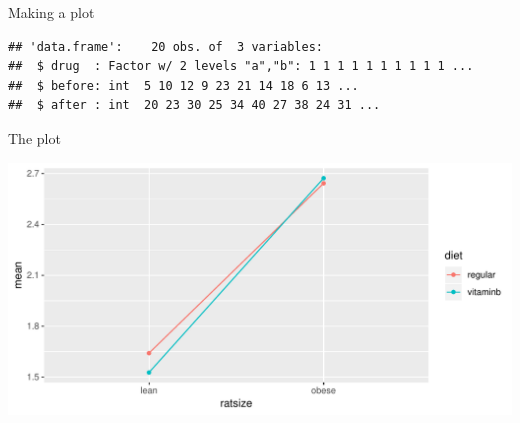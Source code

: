 \begin{frame}[fragile]{Making a plot}

  \begin{footnotesize}

    
  \end{footnotesize}
 
\begin{knitrout}
\color{fgcolor}\begin{kframe}
\begin{alltt}
\hlkwb{=}\hlstd{(}\hlstd{,}
\end{alltt}
\begin{verbatim}
## 'data.frame':	20 obs. of  3 variables:
##  $ drug  : Factor w/ 2 levels "a","b": 1 1 1 1 1 1 1 1 1 1 ...
##  $ before: int  5 10 12 9 23 21 14 18 6 13 ...
##  $ after : int  20 23 30 25 34 40 27 38 24 31 ...
\end{verbatim}
\end{kframe}
\end{knitrout}
  
\begin{knitrout}
\color{fgcolor}\begin{kframe}
\begin{alltt}
\hlkwb{=}\hlstd{(}\hlopt{+}
  \hlstd{()}
\end{alltt}
\end{kframe}
\end{knitrout}
  
  
\end{frame}

\begin{frame}{The plot}

 
\begin{knitrout}
\color{fgcolor}\begin{kframe}
\begin{alltt}
\end{alltt}
\end{kframe}
\includegraphics[width=\maxwidth]{figure/spizzo-1} 

\end{knitrout}
  
  
\end{frame}

